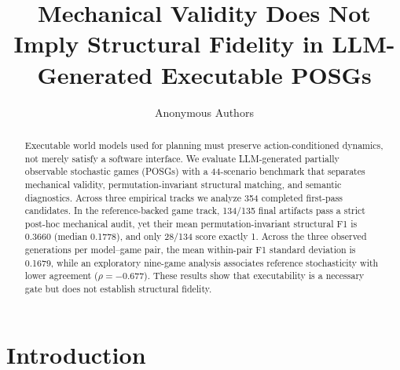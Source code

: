 \documentclass{article}
\title{Mechanical Validity Does Not Imply Structural Fidelity in LLM-Generated Executable POSGs}
\author{Anonymous Authors}
\begin{document}
\maketitle


\begin{abstract}
Executable world models used for planning must preserve action-conditioned dynamics, not merely satisfy a software interface. We evaluate LLM-generated partially observable stochastic games (POSGs) with a 44-scenario benchmark that separates mechanical validity, permutation-invariant structural matching, and semantic diagnostics. Across three empirical tracks we analyze 354 completed first-pass candidates. In the reference-backed game track, 134/135 final artifacts pass a strict post-hoc mechanical audit, yet their mean permutation-invariant structural F1 is 0.3660 (median 0.1778), and only 28/134 score exactly 1. Across the three observed generations per model--game pair, the mean within-pair F1 standard deviation is 0.1679, while an exploratory nine-game analysis associates reference stochasticity with lower agreement ($\rho=-0.677$). These results show that executability is a necessary gate but does not establish structural fidelity.
\end{abstract}

\section{Introduction}
\label{sec:intro}
\end{document}
